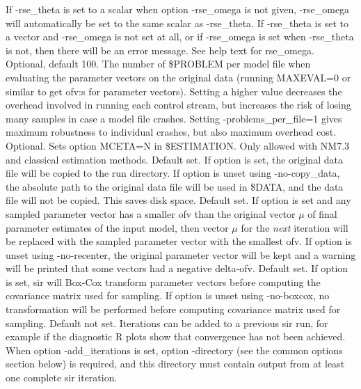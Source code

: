 \begin{optionlist}
If -rse\_theta is set to a scalar when option -rse\_omega is not given, -rse\_omega will 
automatically be set to the same scalar as -rse\_theta. If -rse\_theta is set to a vector and 
-rse\_omega is not set at all, or if -rse\_omega is set when -rse\_theta is not, then there will 
be an error message.
\nextopt
{}
See help text for rse\_omega.
\nextopt
{}
Optional, default 100. The number of \$PROBLEM per model file when evaluating the parameter vectors
on the original data (running
MAXEVAL=0 or similar to get ofv:s for parameter vectors). Setting a higher value
decreases the overhead involved in running each control stream, but increases the 
risk of losing many samples in case a model file crashes. Setting -problems\_per\_file=1
gives maximum robustness to individual crashes, but also maximum overhead cost.
\nextopt
{}
Optional. Sets option MCETA=N in \$ESTIMATION. Only allowed with NM7.3 and classical estimation methods.
\nextopt
{}
Default set. If option is set, the original data file
will be copied to the run directory.
If option is unset using -no-copy\_data, the absolute path to the original data file will be used in
\$DATA, and the data file will not be copied. This saves disk space.
\nextopt
{}
Default set. If option is set and any sampled parameter vector has a smaller ofv than the original
vector $\mu$ of final parameter estimates of the input model, then vector $\mu$ for the \emph{next} iteration will be replaced with
the sampled parameter vector with the smallest ofv.
If option is unset using -no-recenter, the original parameter vector will be kept
and a warning will be printed that some vectors had a negative delta-ofv.
\nextopt
{}
Default set. 
If option is set, sir will Box-Cox transform parameter vectors before computing
the covariance matrix used for sampling.
If option is unset using -no-boxcox, no transformation will be performed before computing covariance matrix
used for sampling.
\nextopt
{}
Default not set. 
Iterations can be added to a previous sir run, for example if the diagnostic R plots show that
convergence has not been achieved. When option -add\_iterations is set, option -directory 
(see the common options section below) is required,
and this directory must contain output from at least one complete sir iteration.


\end{optionlist}
